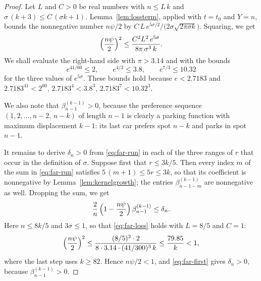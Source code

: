 \documentclass{amsart}
\theoremstyle{definition}
\theoremstyle{remark}
\numberwithin{equation}{section}
\begin{document}
\begin{proof}
Let $L$ and $C>0$ be real numbers with
$n\le L\,k$ and
$\sigma\,(k+3)\le C\,(\sigma k+1)$. Lemma~\ref{lem:lossterm}, applied with
$t=t_0$ and $Y=n$, bounds the nonnegative number $n\psi/2$ by
$C\,L\,e^{5\sigma/2}/\bigl(2\sigma\sqrt{2\pi\sigma k}\bigr)$. Squaring, we
get
\begin{equation}\label{eq:far-loss}
\Bigl(\frac{n\psi}{2}\Bigr)^2\le\frac{C^2L^2\,e^{5\sigma}}{8\pi\,\sigma^3\,k}.
\end{equation}
We shall evaluate the right-hand side with $\pi>3.14$ and with the bounds
\[
e^{41/60}\le2,\qquad e^{4/3}\le3.8,\qquad e^{7/3}\le10.32
\]
for the three values of $e^{5\sigma}$. These bounds hold because $e<2.7183$
and $2.7183^{41}<2^{60}$, $2.7183^{4}<3.8^{3}$, $2.7183^{7}<10.32^{3}$.

We also note that $\beta^{(k-1)}_{n-1}>0$,
because the preference sequence $(1,2,\dots,n-2,\,n-k)$ of length $n-1$ is
clearly a parking function with maximum displacement $k-1$: its last car
prefers spot $n-k$ and parks in spot $n-1$.

It remains to derive $\delta_n>0$ from \eqref{eq:far-run} in each of the
three ranges of $r$ that occur in the definition of $\sigma$. Suppose first
that $r\le3k/5$. Then every index $m$ of the sum in
\eqref{eq:far-run} satisfies $5\,(m+1)\le5r\le3k$, so that its coefficient
is nonnegative by Lemma~\ref{lem:kernelgrowth}; the entries
$\beta^{(k-1)}_{n-1-m}$ are nonnegative as well. Dropping the sum, we get
\begin{equation}\label{eq:far-first}
\frac2n\,\Bigl(1-\frac{n\psi}{2}\Bigr)\,\beta^{(k-1)}_{n-1}\le\delta_n .
\end{equation}
Here $n\le8k/5$ and $3\sigma\le1$, so that \eqref{eq:far-loss} holds with
$L=8/5$ and $C=1$:
\[
\Bigl(\frac{n\psi}{2}\Bigr)^2
\le\frac{(8/5)^2\cdot2}{8\cdot3.14\cdot(41/300)^3\,k}
\le\frac{79.85}{k}<1,
\]
where the last step uses $k\ge82$. Hence $n\psi/2<1$, and
\eqref{eq:far-first} gives $\delta_n>0$, because $\beta^{(k-1)}_{n-1}>0$.


\end{proof}
\end{document}
